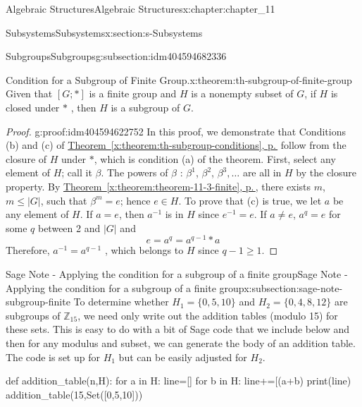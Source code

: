\documentclass[twoside,10pt,]{book}
\newcommand{\xreffont}{\relax}
\numberwithin{equation}{section}
\begin{document}
\begin{chapterptx}{Algebraic Structures}{}{Algebraic Structures}{}{}{x:chapter:chapter_11}
\begin{sectionptx}{Subsystems}{}{Subsystems}{}{}{x:section:s-Subsystems}
\begin{subsectionptx}{Subgroups}{}{Subgroups}{}{}{g:subsection:idm404594682336}
\begin{theorem}{Condition for a Subgroup of Finite Group.}{}{x:theorem:th-subgroup-of-finite-group}
Given that \([G; * ]\) is a finite group and \(H\) is a nonempty subset of \(G\), if \(H\) is closed under \(*\) , then \(H\) is a subgroup of \(G\).%
\end{theorem}
\begin{proof}{}{g:proof:idm404594622752}
In this proof, we demonstrate that Conditions (b) and (c) of \hyperref[x:theorem:th-subgroup-conditions]{Theorem~{\xreffont\ref{x:theorem:th-subgroup-conditions}}, p.\,\pageref{x:theorem:th-subgroup-conditions}} follow from the closure of \(H\) under \(*\), which is condition (a) of the theorem.  First, select any element of \(H\); call it \(\beta\). The powers of \(\beta\) : \(\beta ^1\), \(\beta ^2\), \(\beta^3,\ldots\) are all in \(H\) by the closure property. By \hyperref[x:theorem:theorem-11-3-finite]{Theorem~{\xreffont\ref{x:theorem:theorem-11-3-finite}}, p.\,\pageref{x:theorem:theorem-11-3-finite}}, there exists \(m\), \(m\leq \left| G\right|\), such that \(\beta ^m = e\); hence \(e \in  H\). To prove that (c) is true, we let \(a\) be any element of \(H\). If \(a = e\), then \(a^{-1}\) is in \(H\) since \(e^{-1} = e\). If \(a\neq e\), \(a^q=e\) for some \(q\) between 2 and \(\left| G\right|\) and%
\begin{equation*}
e = a^q = a ^{q-1} * a
\end{equation*}
Therefore, \(a^{-1}= a^{q-1}\) , which belongs to \(H\) since \(q - 1 \geq  1\).%
\end{proof}
\end{subsectionptx}
%
%
\typeout{************************************************}
\typeout{************************************************}
%
\begin{subsectionptx}{Sage Note - Applying the condition for a subgroup of a finite group}{}{Sage Note - Applying the condition for a subgroup of a finite group}{}{}{x:subsection:sage-note-subgroup-finite}
To determine whether \(H_1= \{0, 5, 10\}\) and \(H_2 = \{0, 4, 8, 12\}\) are subgroups of \(\mathbb{Z}_{15}\), we need only write out the addition tables (modulo 15) for these sets.  This is easy to do with a bit of Sage code that we include below and then for any modulus and subset, we can generate the body of an addition table.   The code is set up for \(H_1\) but can be easily adjusted for \(H_2\).%
\begin{sageinput}
def addition_table(n,H):
    for a in H:
        line=[]
        for b in H:
            line+=[(a+b)%
        print(line)
addition_table(15,Set([0,5,10]))

\end{sageinput}
\end{subsectionptx}
\end{sectionptx}
\end{chapterptx}
\end{document}
